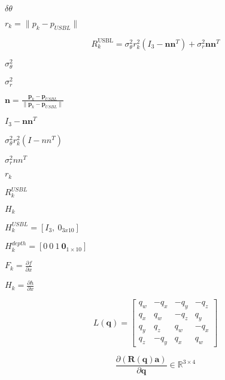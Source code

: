 \documentclass{article}
\begin{document}
$ \delta\theta $
\pagebreak

$ r_k = \|p_k - p_{USBL}\| $
\pagebreak

\[
R_k^{\text{USBL}} = \sigma_\theta^2 r_k^2 (I_3 - \mathbf{n}\mathbf{n}^T) + \sigma_r^2 \mathbf{n}\mathbf{n}^T
\]
\pagebreak

$ \sigma_\theta^2 $
\pagebreak

$ \sigma_r^2 $
\pagebreak

$ \mathbf{n} = \frac{\mathbf{p}_k - \mathbf{p}_{USBL}}{\|\mathbf{p}_k - \mathbf{p}_{USBL}\|} $
\pagebreak

$ I_3 - \mathbf{n}\mathbf{n}^T $
\pagebreak

$ \sigma_\theta^2 r_k^2 (I - nn^T) $
\pagebreak

$ \sigma_r^2 nn^T $
\pagebreak

$ r_k $
\pagebreak

$ R_k^{USBL} $
\pagebreak

$ H_k $
\pagebreak

$ H_k^{USBL} = [I_3,\ 0_{3x10}] $
\pagebreak

$ H_k^{depth} = [0\ 0\ 1\ \mathbf{0}_{1 \times 10}] $
\pagebreak

$ F_k = \frac{\partial f}{\partial x} $
\pagebreak

$ H_k = \frac{\partial h}{\partial x} $
\pagebreak

\[
L(\mathbf{q}) =
\begin{bmatrix}
q_w & -q_x & -q_y & -q_z \\
q_x &  q_w & -q_z &  q_y \\
q_y &  q_z &  q_w & -q_x \\
q_z & -q_y &  q_x &  q_w
\end{bmatrix}
\]
\pagebreak

\[
\frac{\partial (\mathbf{R}(\mathbf{q}) \mathbf{a})}{\partial \mathbf{q}} \in \mathbb{R}^{3 \times 4}
\]
\pagebreak
\end{document}
